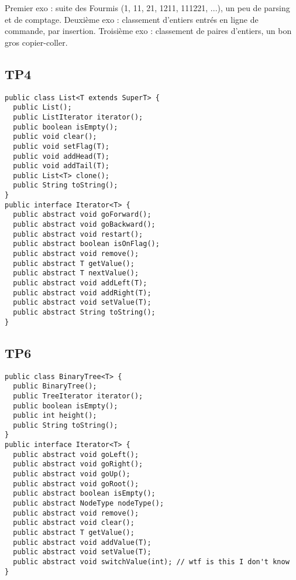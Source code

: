 \documentclass[a4paper]{article}
\begin{document}
Premier exo : suite des Fourmis (1, 11, 21, 1211, 111221, ...), un peu de parsing et de comptage. Deuxième exo : classement d'entiers entrés en ligne de commande, par insertion. Troisième exo : classement de paires d'entiers, un bon gros copier-coller.

\subsection*{TP4}

\begin{lstlisting}
public class List<T extends SuperT> {
  public List();
  public ListIterator iterator();
  public boolean isEmpty();
  public void clear();
  public void setFlag(T);
  public void addHead(T);
  public void addTail(T);
  public List<T> clone();
  public String toString();
}
public interface Iterator<T> {
  public abstract void goForward();
  public abstract void goBackward();
  public abstract void restart();
  public abstract boolean isOnFlag();
  public abstract void remove();
  public abstract T getValue();
  public abstract T nextValue();
  public abstract void addLeft(T);
  public abstract void addRight(T);
  public abstract void setValue(T);
  public abstract String toString();
}
\end{lstlisting}

\subsection*{TP6}

\begin{lstlisting}
public class BinaryTree<T> {
  public BinaryTree();
  public TreeIterator iterator();
  public boolean isEmpty();
  public int height();
  public String toString();
}
public interface Iterator<T> {
  public abstract void goLeft();
  public abstract void goRight();
  public abstract void goUp();
  public abstract void goRoot();
  public abstract boolean isEmpty();
  public abstract NodeType nodeType();
  public abstract void remove();
  public abstract void clear();
  public abstract T getValue();
  public abstract void addValue(T);
  public abstract void setValue(T);
  public abstract void switchValue(int); // wtf is this I don't know
}
\end{lstlisting}
\end{document}
